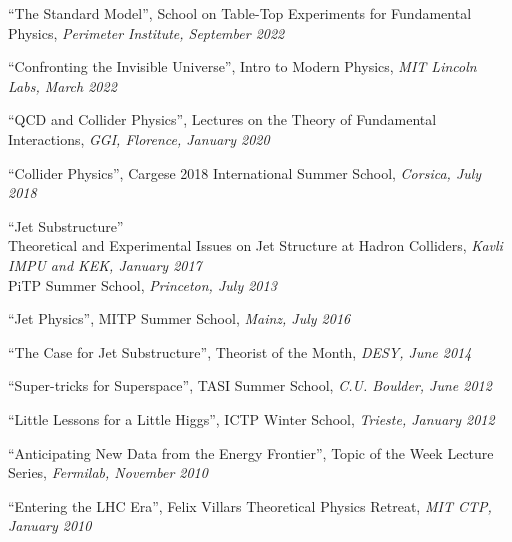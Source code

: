 \bbl

\item ``The Standard Model'', School on Table-Top Experiments for Fundamental Physics, \emph{Perimeter Institute, September 2022}

\item ``Confronting the Invisible Universe'', Intro to Modern Physics, \emph{MIT Lincoln Labs, March 2022}

\item ``QCD and Collider Physics'', Lectures on the Theory of Fundamental Interactions, \emph{GGI, Florence, January 2020}

\item ``Collider Physics'', Cargese 2018 International Summer School, \emph{Corsica, July 2018}

\item ``Jet Substructure''
\\ \sh Theoretical and Experimental Issues on Jet Structure at Hadron Colliders, \emph{Kavli IMPU and KEK, January 2017}
\\ \sh PiTP Summer School, \emph{Princeton, July 2013}

\item ``Jet Physics'', MITP Summer School, \emph{Mainz, July 2016}

\item ``The Case for Jet Substructure'', Theorist of the Month, \emph{DESY, June 2014}

\item ``Super-tricks for Superspace'', TASI Summer School, \emph{C.U. Boulder, June 2012}

\item ``Little Lessons for a Little Higgs'', ICTP Winter School, \emph{Trieste, January 2012}

\item ``Anticipating New Data from the Energy Frontier'', Topic of the Week Lecture Series, \emph{Fermilab, November 2010}

\item ``Entering the LHC Era'', Felix Villars Theoretical Physics Retreat, \emph{MIT CTP, January 2010}

\el
